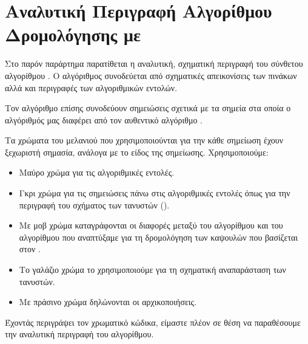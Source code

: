 \chapter{Αναλυτική Περιγραφή Αλγορίθμου Δρομολόγησης με }
\label{chap:SOM_appendix}
Στο παρόν παράρτημα παρατίθεται η αναλυτική, σχηματική περιγραφή του σύνθετου αλγορίθμου . Ο αλγόριθμος συνοδεύεται από σχηματικές απεικονίσεις των πινάκων αλλά και περιγραφές των αλγοριθμικών εντολών.\par

Τον αλγόριθμο επίσης συνοδεύουν σημειώσεις σχετικά με τα σημεία στα οποία ο αλγόριθμός μας διαφέρει από τον αυθεντικό αλγόριθμο . \par

Τα χρώματα του μελανιού που χρησιμοποιούνται για την κάθε σημείωση έχουν ξεχωριστή σημασία, ανάλογα με το είδος της σημείωσης. Χρησιμοποιούμε:
\begin{itemize}
    \item Μαύρο χρώμα για τις αλγοριθμικές εντολές.
    \item Γκρι χρώμα για τις σημειώσεις πάνω στις αλγοριθμικές εντολές όπως για την περιγραφή του σχήματος των τανυστών ().
    \item Με μοβ χρώμα καταγράφονται οι διαφορές μεταξύ του αλγορίθμου  και του αλγορίθμου που αναπτύξαμε για τη δρομολόγηση των καψουλών που βασίζεται στον .
    \item Το γαλάζιο χρώμα το χρησιμοποιούμε για τη σχηματική αναπαράσταση των τανυστών.
    \item Με πράσινο χρώμα δηλώνονται οι αρχικοποιήσεις.
\end{itemize} 

Έχοντάς περιγράψει τον χρωματικό κώδικα, είμαστε πλέον σε θέση να παραθέσουμε την αναλυτική περιγραφή του αλγορίθμου.

